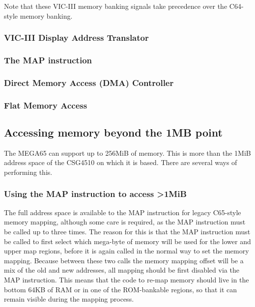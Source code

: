 Note that these VIC-III memory banking signals take precedence over the
C64-style memory banking.

\subsubsection{VIC-III Display Address Translator}

\subsubsection{The MAP instruction}

\subsubsection{Direct Memory Access (DMA) Controller}

\subsubsection{Flat Memory Access}
   
\subsection{Accessing memory beyond the 1MB point}
\label{sec:exte nded-memory}
 
The MEGA65 can support up to 256MiB of memory. This is more than the 1MiB address space of the CSG4510
on which it is based. There are several ways of performing this.

\subsubsection{Using the MAP instruction to access >1MiB}
   
The full address space is available to the MAP instruction for legacy C65-style memory
mapping, although some care is required, as the MAP instruction must be called up to three times.
The reason for this is that the MAP instruction must be called to first select which mega-byte of
memory will be used for the lower and upper map regions, before it is again called in the normal
way to set the memory mapping.  Because between these two calls the memory mapping offset will be
a mix of the old and new addresses, all mapping should be first disabled via the MAP instruction.
This means that the code to re-map memory should live in the bottom 64KB of RAM or in one of the
ROM-bankable regions, so that it can remain visible during the mapping process.
   
